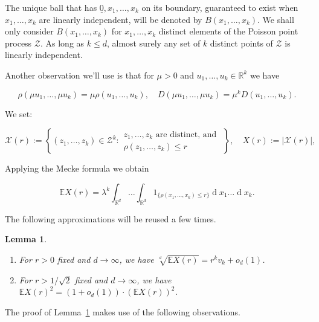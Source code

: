 \documentclass[11pt]{article}%
\newtheorem{lemma} [theorem] {Lemma}%
\newcommand{\Xcal}[0]{\ensuremath{{\mathcal X}}}
\newcommand{\Zcal}[0]{\ensuremath{{\mathcal Z}}}
\newcommand{\eR}[0]{\ensuremath{ \mathbb R}}
\newcommand{\Ee}[0]{\ensuremath{{\mathbb E}}}
\newcommand{\orig}{\underline{0}}
\DeclareMathOperator{\dd}{d}
\begin{document}
The unique ball that has $\orig,x_1,\dots,x_k$ on its boundary, guaranteed to exist 
when $x_1,\dots,x_k$ are linearly independent, 
will be denoted by $B(x_1,\dots,x_k)$.
We shall only consider $B(x_1,\dots,x_k)$ for $x_1,\dots,x_k$ distinct elements of the Poisson point process $\Zcal$.
As long as $k \leq d$, almost surely any set of $k$ distinct points of $\Zcal$ is linearly independent.

Another observation we'll use is that for $\mu>0$ and $u_1,\dots,u_k \in \eR^k$ we have 

\begin{equation}\label{eq:rescale} \rho(\mu u_1, \dots, \mu u_k ) = \mu \rho(u_1,\dots,u_k), \quad 
D(\mu u_1,\dots,\mu u_k)
= \mu^k D(u_1,\dots,u_k). 
\end{equation}

We set: 


\begin{equation}\label{eq:Xdef} 
\Xcal(r) := \left\{ (z_1,\dots,z_k) \in \Zcal^k : \begin{array}{l} z_1,\dots,z_k \text{ are distinct, and } \\
\rho(z_1,\dots,z_k) \leq r \end{array} \right\}, \quad X(r) := \left|\Xcal(r)\right|,
\end{equation}

\noindent
Applying the Mecke formula we obtain

\begin{equation}\label{eq:Xmecke}
\Ee X(r) = \lambda^k \int_{\eR^d}\dots\int_{\eR^d} 1_{\{\rho(x_1,\dots,x_k) \leq r\}}  \dd x_1\dots\dd x_k. 
\end{equation}

\noindent
The following approximations will be reused a few times.

\begin{lemma}\label{lem:Iint} 
$\text{ }$
\begin{enumerate}
 \item\label{itm:Iint} For $r>0$ fixed and $d\to\infty$, we have $\displaystyle\sqrt[d]{\Ee X(r)} = r^k v_k + o_d(1)$.
 \item\label{itm:Iint2} For $r>1/\sqrt{2}$ fixed and $d\to\infty$, we have 
 $\displaystyle\Ee X(r)^2 = (1+o_d(1)) \cdot \left(\Ee X(r)\right)^2$.
\end{enumerate}
\end{lemma}

\noindent
The proof of Lemma~\ref{lem:Iint} makes use of the following observations.
\end{document}
